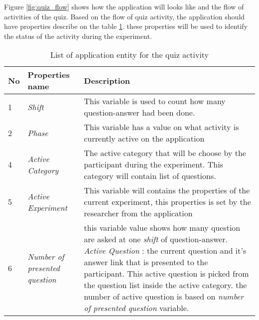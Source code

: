 Figure \ref{fig:quiz_flow} shows how the application will looks like and the flow of activities of the quiz. Based on the flow of quiz activity, the application should have properties describe on the table \ref{tab:requirementList}. these properties will be used to identify the status of the activity during the experiment.

\begin{table}[!t]
  \centering
	\begin{tabular}{ |p{0.5cm}|p{5cm}|p{10cm}|  }
     No& Properties name & Description \\
     \hline
     1   & \textit{Shift} & This variable is used to count how many question-answer had been done.\\
     2 & \textit{Phase} & This variable has a value on what activity is currently active on the application\\
     4 & \textit{Active Category} & The active category that will be choose by the participant during the experiment. This category will contain list of questions. \\
     5 &  \textit{Active Experiment} & This variable will contains the properties of the current experiment, this properties is set by the researcher from the application\\
     6 & \textit{Number of presented question} & this variable value shows how many question are asked at one \textit{shift} of question-answer.
\textit{Active Question }: the current question and it's answer link that is presented to the participant. This active question is picked from the question list inside the active category. the number of active question is based on \textit{number of presented question} variable.\\
    \end{tabular}
 \caption{List of application entity for the quiz activity}
 \label{tab:requirementList}
\end{table}



